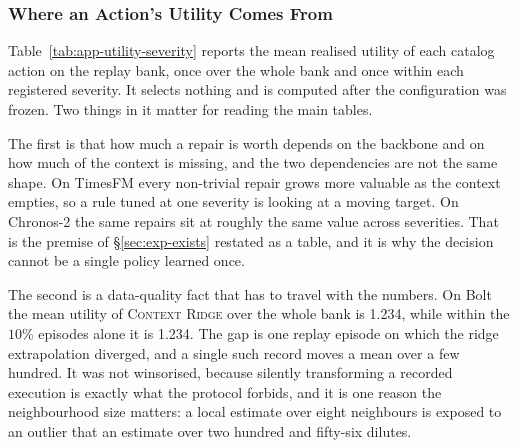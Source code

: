 \documentclass{article}
\begin{document}
\subsubsection{Where an Action's Utility Comes From}
\label{app:utility-by-severity}
Table~\ref{tab:app-utility-severity} reports the mean realised utility of each catalog action
on the replay bank, once over the whole bank and once within each registered severity. It
selects nothing and is computed after the configuration was frozen. Two things in it matter for
reading the main tables.

The first is that how much a repair is worth depends on the backbone and on how much of the
context is missing, and the two dependencies are not the same shape. On TimesFM every
non-trivial repair grows more valuable as the context empties, so a rule tuned at one severity
is looking at a moving target. On Chronos-2 the same repairs sit at roughly the same value
across severities. That is the premise of \S\ref{sec:exp-exists} restated as a table, and it is
why the decision cannot be a single policy learned once.

The second is a data-quality fact that has to travel with the numbers. On Bolt the mean utility
of \textsc{Context Ridge} over the whole bank is 1.234, while within the $10\%$
episodes alone it is 1.234. The gap is one replay episode on which the ridge
extrapolation diverged, and a single such record moves a mean over a few hundred. It was not
winsorised, because silently transforming a recorded execution is exactly what the protocol
forbids, and it is one reason the neighbourhood size matters: a local estimate over eight
neighbours is exposed to an outlier that an estimate over two hundred and fifty-six dilutes.
\end{document}
